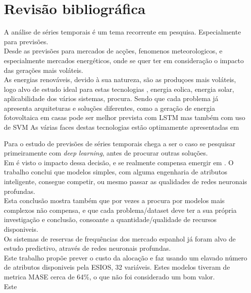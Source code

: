 \chapter{Revisão bibliográfica}

A análise de séries temporais é um tema recorrente em pesquisa. Especialmente para previsões.\\
Desde as previsões para mercados de acções\cite{Bhandari2022}, fenomenos meteorologicos\cite{Wang2019}, e especialmente mercados energéticos, onde se quer ter em consideração o impacto das gerações mais voláteis. \\
As energias renováveis, devido à sua natureza, são as produçoes mais voláteis, logo alvo de estudo ideal para estas tecnologias\cite{Lu2015}
, energia eolica\cite{Sun2022}, energia solar\cite{Rajasundrapandiyanleebanon2023}, aplicabilidade dos vários sistemas\cite{Ahmad2020}, procura\cite{Antonopoulos2020}.
Sendo que cada problema já apresenta arquiteturas e soluções diferentes, como a geração de energia fotovoltaica em casas pode ser melhor prevista com LSTM\cite{Costa2022} mas também com uso de SVM\cite{Meenal2018}
As várias faces destas tecnologias estão optimamente apresentadas em\cite{Benti2023}



Para o estudo de previsões de séries temporais chega a ser o caso se pesquisar primeiramente com \textit{deep learning}, antes de procurar outras soluções.\\
Em \cite{Elsayed} é visto o impacto dessa decisão, e se realmente compensa emergir em . O trabalho conclui que modelos simples, com alguma engenharia de atributos inteligente, consegue competir, ou mesmo passar as qualidades de redes neuronais profundas. \\
Esta conclusão mostra também que por vezes a procura por modelos mais complexos não compensa, e que cada problema/dataset deve ter a sua própria investigação e conclusão, consoante a quantidade/qualidade de recursos disponiveis. \\


Os sistemas de reservas de frequências dos mercado espanhol já foram alvo de estudo predictivo, através de redes neuronais profundas\cite{miota2023}.\\
Este trabalho propõe prever o custo da alocação e faz usando um elavado número de atributos disponiveis pela ESIOS, 32 variáveis. Estes modelos tiveram de metrica MASE cerca de 64\%, o que não foi considerado um bom valor.\\
Este 

